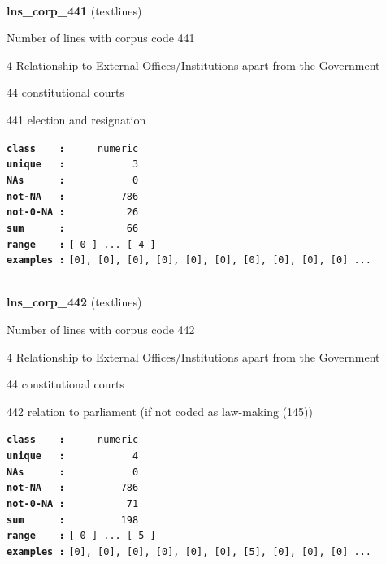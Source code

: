 \documentclass[]{article}
\begin{document}
~

\textbf{lns\_corp\_441} (textlines)

Number of lines with corpus code 441

4 Relationship to External Offices/Institutions apart from the
Government

44 constitutional courts

441 election and resignation

\textbf{\texttt{class\ \ \ \ :}} \texttt{~~~~~numeric}\\
\textbf{\texttt{unique\ \ \ :}} \texttt{~~~~~~~~~~~3}\\
\textbf{\texttt{NAs\ \ \ \ \ \ :}} \texttt{~~~~~~~~~~~0}\\
\textbf{\texttt{not-NA\ \ \ :}} \texttt{~~~~~~~~~786}\\
\textbf{\texttt{not-0-NA\ :}} \texttt{~~~~~~~~~~26}\\
\textbf{\texttt{sum\ \ \ \ \ \ :}} \texttt{~~~~~~~~~~66}\\
\textbf{\texttt{range\ \ \ \ :}}
\texttt{{[}\ 0\ {]}\ ...\ {[}\ 4\ {]}}\\
\textbf{\texttt{examples\ :}}
\texttt{{[}0{]},\ {[}0{]},\ {[}0{]},\ {[}0{]},\ {[}0{]},\ {[}0{]},\ {[}0{]},\ {[}0{]},\ {[}0{]},\ {[}0{]}\ ...}\\

~

\textbf{lns\_corp\_442} (textlines)

Number of lines with corpus code 442

4 Relationship to External Offices/Institutions apart from the
Government

44 constitutional courts

442 relation to parliament (if not coded as law-making (145))

\textbf{\texttt{class\ \ \ \ :}} \texttt{~~~~~numeric}\\
\textbf{\texttt{unique\ \ \ :}} \texttt{~~~~~~~~~~~4}\\
\textbf{\texttt{NAs\ \ \ \ \ \ :}} \texttt{~~~~~~~~~~~0}\\
\textbf{\texttt{not-NA\ \ \ :}} \texttt{~~~~~~~~~786}\\
\textbf{\texttt{not-0-NA\ :}} \texttt{~~~~~~~~~~71}\\
\textbf{\texttt{sum\ \ \ \ \ \ :}} \texttt{~~~~~~~~~198}\\
\textbf{\texttt{range\ \ \ \ :}}
\texttt{{[}\ 0\ {]}\ ...\ {[}\ 5\ {]}}\\
\textbf{\texttt{examples\ :}}
\texttt{{[}0{]},\ {[}0{]},\ {[}0{]},\ {[}0{]},\ {[}0{]},\ {[}0{]},\ {[}5{]},\ {[}0{]},\ {[}0{]},\ {[}0{]}\ ...}\\
\end{document}
